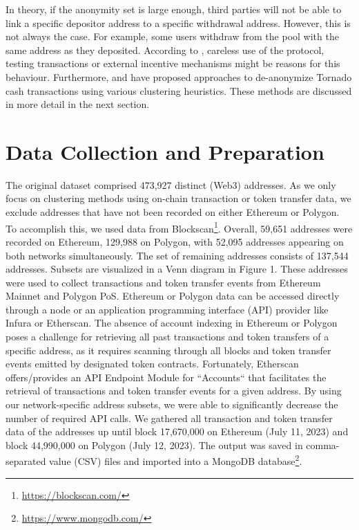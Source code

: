 \documentclass[12pt,a4paper,titlepage,oneside,english]{article}
\begin{document}
In theory, if the anonymity set is large enough, third parties will not be able to link a specific depositor address to a specific withdrawal address. However, this is not always the case. For example, some users withdraw from the pool with the same address as they deposited. According to \cite{nadler2023tornado}, careless use of the protocol, testing transactions or external incentive mechanisms might be reasons for this behaviour. \newline
Furthermore, \cite{Beres2020} and \cite{wu2022tutela} have proposed approaches to de-anonymize Tornado cash transactions using various clustering heuristics. These methods are discussed in more detail in the next section.

 


\section{Data Collection and Preparation}

The original dataset comprised 473,927 distinct (Web3) addresses. As we only focus on clustering methods using on-chain transaction or token transfer data, we exclude addresses that have not been recorded on either Ethereum or Polygon. To accomplish this, we used data from Blockscan\footnote{\url{https://blockscan.com/}}. Overall, 59,651 addresses were recorded on Ethereum, 129,988 on Polygon, with 52,095 addresses appearing on both networks simultaneously. The set of remaining addresses consists of 137,544 addresses. Subsets are visualized in a Venn diagram in Figure 1. 
These addresses were used to collect transactions and token transfer events from Ethereum Mainnet and Polygon PoS. Ethereum or Polygon data can be accessed directly through a node or an application programming interface (API) provider like Infura or Etherscan. The absence of account indexing in Ethereum or Polygon poses a challenge for retrieving all past transactions and token transfers of a specific address, as it requires scanning through all blocks and token transfer events emitted by designated token contracts. Fortunately, Etherscan offers/provides an API Endpoint Module for ``Accounts`` that facilitates the retrieval of transactions and token transfer events for a given address. By using our network-specific address subsets, we were able to significantly decrease the number of required API calls. 
We gathered all transaction and token transfer data of the addresses up until block 17,670,000 on Ethereum (July 11, 2023) and block 44,990,000 on Polygon (July 12, 2023). The output was saved in comma-separated value (CSV) files and imported into a MongoDB database\footnote{\url{https://www.mongodb.com/}}.
\end{document}
